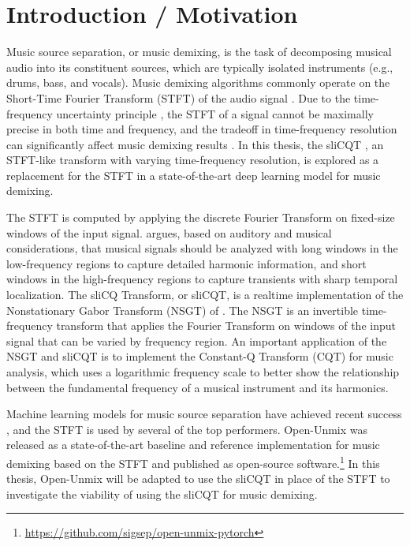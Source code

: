 \documentclass[letter,12pt]{article}
\title{\vspace{-2.25em}\ThesisTitle\vspace{-0.5em}}
\author{Sevag Hanssian}
\date{\vspace{-0.5em}October 27, 2021\vspace{-1.25em}}
\begin{document}
\maketitle

\section{Introduction / Motivation}

Music source separation, or music demixing, is the task of decomposing musical audio into its constituent sources, which are typically isolated instruments (e.g., drums, bass, and vocals). Music demixing algorithms commonly operate on the Short-Time Fourier Transform (STFT) of the audio signal \parencite{musicsepgood}. Due to the time-frequency uncertainty principle \parencite{gabor1946}, the STFT of a signal cannot be maximally precise in both time and frequency, and the tradeoff in time-frequency resolution can significantly affect music demixing results \parencite{tftradeoff1}. In this thesis, the sliCQT \parencite{slicq}, an STFT-like transform with varying time-frequency resolution, is explored as a replacement for the STFT in a state-of-the-art deep learning model for music demixing.

The STFT is computed by applying the discrete Fourier Transform on fixed-size windows of the input signal. \textcite{doerflerphd} argues, based on auditory and musical considerations, that musical signals should be analyzed with long windows in the low-frequency regions to capture detailed harmonic information, and short windows in the high-frequency regions to capture transients with sharp temporal localization. The sliCQ Transform, or sliCQT, is a realtime implementation of the Nonstationary Gabor Transform (NSGT) of \textcite{balazs}. The NSGT is an invertible time-frequency transform that applies the Fourier Transform on windows of the input signal that can be varied by frequency region. An important application of the NSGT and sliCQT is to implement the Constant-Q Transform (CQT) \parencite{jbrown} for music analysis, which uses a logarithmic frequency scale to better show the relationship between the fundamental frequency of a musical instrument and its harmonics.

Machine learning models for music source separation have achieved recent success \parencite{sisec2018}, and the STFT is used by several of the top performers. Open-Unmix \parencite{umx} was released as a state-of-the-art baseline and reference implementation for music demixing based on the STFT and published as open-source software.\footnote{\url{https://github.com/sigsep/open-unmix-pytorch}} In this thesis, Open-Unmix will be adapted to use the sliCQT in place of the STFT to investigate the viability of using the sliCQT for music demixing.
\end{document}
